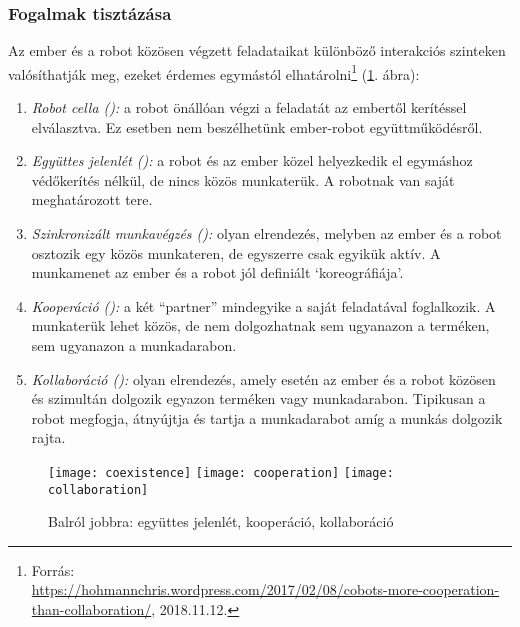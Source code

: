 \documentclass[../documentation.tex]{subfiles}
\begin{document}
\subsubsection{Fogalmak tisztázása}
Az ember és a robot közösen végzett feladataikat különböző interakciós szinteken valósíthatják meg, ezeket érdemes egymástól elhatárolni\footnote{Forrás:\\ \url{https://hohmannchris.wordpress.com/2017/02/08/cobots-more-cooperation-than-collaboration/}, 2018.11.12.} (\ref{fig:coex-coop-collab}. ábra):
\begin{enumerate}
	\item \textit{Robot cella ():} a robot önállóan végzi a feladatát az embertől kerítéssel elválasztva. Ez esetben nem beszélhetünk ember-robot együttműködésről.
	\item \textit{Együttes jelenlét ():} a robot és az ember közel helyezkedik el egymáshoz védőkerítés nélkül, de nincs közös munkaterük. A robotnak van saját meghatározott tere.
	\item \textit{Szinkronizált munkavégzés ():} olyan elrendezés, melyben az ember és a robot osztozik egy közös munkateren, de egyszerre csak egyikük aktív. A munkamenet az ember és a robot jól definiált `koreográfiája'.
	\item \textit{Kooperáció ():} a két ``partner'' mindegyike a saját feladatával foglalkozik. A munkaterük lehet közös, de nem dolgozhatnak sem ugyanazon a terméken, sem ugyanazon a munkadarabon.
	\item \textit{Kollaboráció ():} olyan elrendezés, amely esetén az ember és a robot közösen és szimultán dolgozik egyazon terméken vagy munkadarabon. Tipikusan a robot megfogja, átnyújtja és tartja a munkadarabot amíg a munkás dolgozik rajta.
\end{enumerate}

\begin{figure}[h]
	\centering
	\texttt{[image: coexistence]}
	\texttt{[image: cooperation]}
	\texttt{[image: collaboration]}
	\caption[Caption for LOF]{Balról jobbra: együttes jelenlét, kooperáció, kollaboráció\footnotemark}
	\label{fig:coex-coop-collab}
\end{figure}

\end{document}
